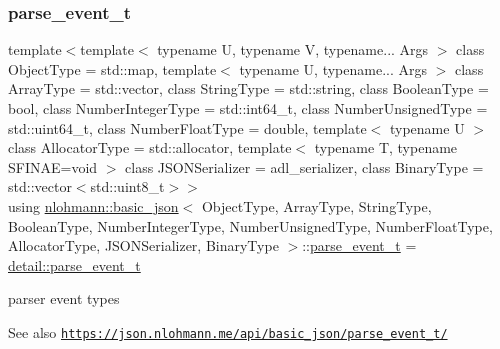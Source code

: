 \subsubsection{\texorpdfstring{parse\+\_\+event\+\_\+t}{parse\_event\_t}}
{\footnotesize\ttfamily template$<$template$<$ typename U, typename V, typename... Args $>$ class Object\+Type = std\+::map, template$<$ typename U, typename... Args $>$ class Array\+Type = std\+::vector, class String\+Type  = std\+::string, class Boolean\+Type  = bool, class Number\+Integer\+Type  = std\+::int64\+\_\+t, class Number\+Unsigned\+Type  = std\+::uint64\+\_\+t, class Number\+Float\+Type  = double, template$<$ typename U $>$ class Allocator\+Type = std\+::allocator, template$<$ typename T, typename S\+F\+I\+N\+A\+E=void $>$ class J\+S\+O\+N\+Serializer = adl\+\_\+serializer, class Binary\+Type  = std\+::vector$<$std\+::uint8\+\_\+t$>$$>$ \\
using \hyperlink{classnlohmann_1_1basic__json}{nlohmann\+::basic\+\_\+json}$<$ Object\+Type, Array\+Type, String\+Type, Boolean\+Type, Number\+Integer\+Type, Number\+Unsigned\+Type, Number\+Float\+Type, Allocator\+Type, J\+S\+O\+N\+Serializer, Binary\+Type $>$\+::\hyperlink{namespacenlohmann_1_1detail_a59e696b1dad6d0d99c172ac4518c2042}{parse\+\_\+event\+\_\+t} =  \hyperlink{namespacenlohmann_1_1detail_a59e696b1dad6d0d99c172ac4518c2042}{detail\+::parse\+\_\+event\+\_\+t}}



parser event types 

\begin{DoxySeeAlso}{See also}
\href{https://json.nlohmann.me/api/basic_json/parse_event_t/}{\tt https\+://json.\+nlohmann.\+me/api/basic\+\_\+json/parse\+\_\+event\+\_\+t/} 
\end{DoxySeeAlso}
\mbox{\label{classnlohmann_1_1basic__json_a0273d074462644e5d5a7ff313ad0d742}} 
